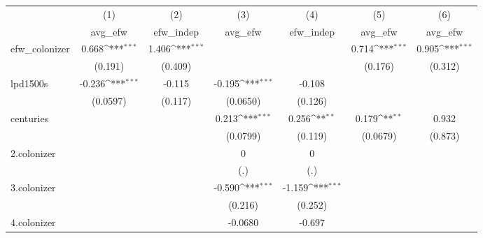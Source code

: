 {
\def\sym#1{\ifmmode^{#1}\else\(^{#1}\)\fi}
\begin{tabular}{l*{6}{c}}
\hline\hline
            &\multicolumn{1}{c}{(1)}&\multicolumn{1}{c}{(2)}&\multicolumn{1}{c}{(3)}&\multicolumn{1}{c}{(4)}&\multicolumn{1}{c}{(5)}&\multicolumn{1}{c}{(6)}\\
            &\multicolumn{1}{c}{avg\_efw}&\multicolumn{1}{c}{efw\_indep}&\multicolumn{1}{c}{avg\_efw}&\multicolumn{1}{c}{efw\_indep}&\multicolumn{1}{c}{avg\_efw}&\multicolumn{1}{c}{avg\_efw}\\
\hline
efw\_colonizer&       0.668\sym{***}&       1.406\sym{***}&                     &                     &       0.714\sym{***}&       0.905\sym{***}\\
            &     (0.191)         &     (0.409)         &                     &                     &     (0.176)         &     (0.312)         \\
[1em]
lpd1500s    &      -0.236\sym{***}&      -0.115         &      -0.195\sym{***}&      -0.108         &                     &                     \\
            &    (0.0597)         &     (0.117)         &    (0.0650)         &     (0.126)         &                     &                     \\
[1em]
centuries   &                     &                     &       0.213\sym{***}&       0.256\sym{**} &       0.179\sym{**} &       0.932         \\
            &                     &                     &    (0.0799)         &     (0.119)         &    (0.0679)         &     (0.873)         \\
[1em]
2.colonizer &                     &                     &           0         &           0         &                     &                     \\
            &                     &                     &         (.)         &         (.)         &                     &                     \\
[1em]
3.colonizer &                     &                     &      -0.590\sym{***}&      -1.159\sym{***}&                     &                     \\
            &                     &                     &     (0.216)         &     (0.252)         &                     &                     \\
[1em]
4.colonizer &                     &                     &     -0.0680         &      -0.697         &                     &                     \\

\end{tabular}}
